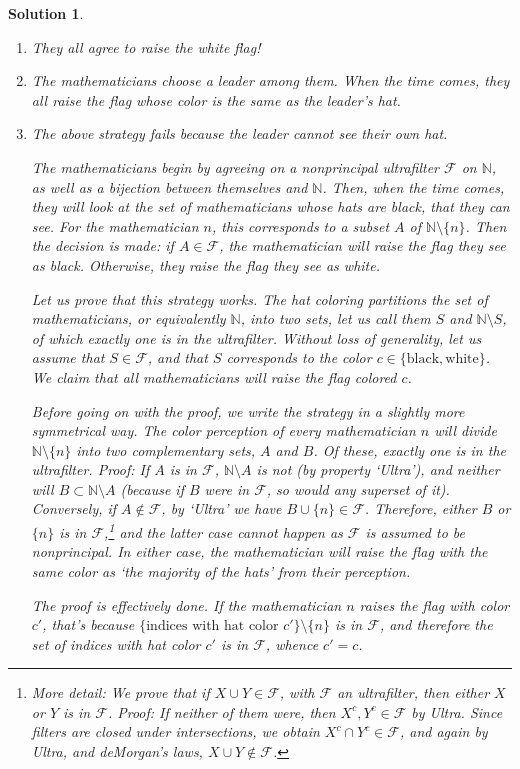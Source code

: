 \documentclass{article}
\theoremstyle{nonumberplain}
\newtheorem{sol}{Solution}
\newcommand{\N}{\mathbb{N}}
\newcommand{\calF}{\mathcal{F}}
\begin{document}
\begin{sol}
\leavevmode
\begin{enumerate}
\item They all agree to raise the white flag!

\item The mathematicians choose a leader among them. When the time comes, they all raise the flag whose color is the same as the leader's hat.

\item The above strategy fails because the leader cannot see their own hat.

The mathematicians begin by agreeing on a nonprincipal ultrafilter $\calF$ on $\N$, as well as a bijection between themselves and $\N$. Then, when the time comes, they will look at the set of mathematicians whose hats are black, that they can see. For the mathematician $n$, this corresponds to a subset $A$ of $\N \setminus \{n\}$. Then the decision is made: if $A \in \calF$, the mathematician will raise the flag they see as black. Otherwise, they raise the flag they see as white.

Let us prove that this strategy works. The hat coloring partitions the set of mathematicians, or equivalently $\N$, into two sets, let us call them $S$ and $\N \setminus S$, of which exactly one is in the ultrafilter. Without loss of generality, let us assume that $S \in \calF$, and that $S$ corresponds to the color $c \in \{\text{black}, \text{white}\}$. We claim that all mathematicians will raise the flag colored $c$.

Before going on with the proof, we write the strategy in a slightly more symmetrical way. The color perception of every mathematician $n$ will divide $\N \setminus \{n\}$ into two complementary sets, $A$ and $B$. Of these, exactly one is in the ultrafilter. Proof: If $A$ is in $\calF$, $\N \setminus A$ is not (by property `Ultra'), and neither will $B \subset \N \setminus A$ (because if $B$ were in $\calF$, so would any superset of it). Conversely, if $A \notin \calF$, by `Ultra' we have $B \cup \{n\} \in \calF$. Therefore, either $B$ or $\{n\}$ is in $\calF$,\footnote{More detail: We prove that if $X \cup Y \in \calF$, with $\calF$ an ultrafilter, then either $X$ or $Y$ is in $\calF$. Proof: If neither of them were, then $X^c, Y^c \in \calF$ by Ultra. Since filters are closed under intersections, we obtain $X^c \cap Y^c \in \calF$, and again by Ultra, and deMorgan's laws, $X \cup Y \notin \calF$.} and the latter case cannot happen as $\calF$ is assumed to be nonprincipal. In either case, the mathematician will raise the flag with the same color as `the majority of the hats' from their perception.

The proof is effectively done. If the mathematician $n$ raises the flag with color $c'$, that's because $\{\text{indices with hat color $c'$}\} \setminus \{n\}$ is in $\calF$, and therefore the set of indices with hat color $c'$ is in $\calF$, whence $c' = c$.
\end{enumerate}
\end{sol}
\end{document}
